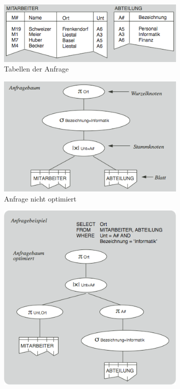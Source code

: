 \begin{figure}[h!]
	\centering
	\begin{subfigure}[b]{0.3\textwidth}
		\includegraphics[width=\textwidth]{fig/anfrage_tabellen.png}
		\caption{Tabellen der Anfrage}
	\end{subfigure}
	\begin{subfigure}[b]{0.3\textwidth}
		\includegraphics[width=\textwidth]{fig/anfrage_nicht_optimiert.png}
		\caption{Anfrage nicht optimiert}
	\end{subfigure}
	\begin{subfigure}[b]{0.3\textwidth}
		\includegraphics[width=\textwidth]{fig/anfrage_optimiert.png}

\end{subfigure}
\end{figure}
